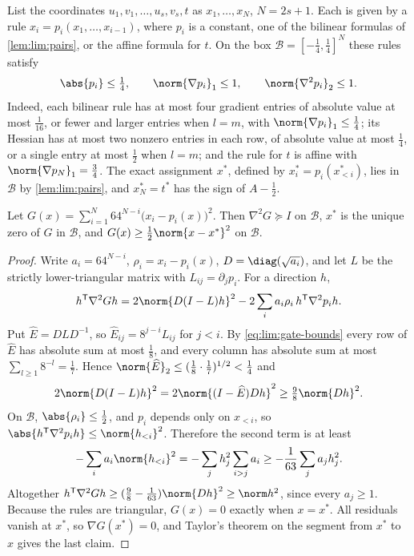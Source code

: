 List the coordinates $u_1,v_1,\ldots,u_s,v_s,t$ as $x_1,\ldots,x_N$, $N=2s+1$.
Each is given by a rule $x_i=p_i(x_1,\ldots,x_{i-1})$, where $p_i$ is a
constant, one of the bilinear formulas of \cref{lem:lim:pairs}, or the
affine formula for $t$. On the box $\mathcal B=[-\frac14,\frac14]^N$ these
rules satisfy
\begin{equation}\label{eq:lim:gate-bounds}
 \abs{p_i}\le\tfrac14,\qquad\norm{\nabla p_i}_1\le1,\qquad
 \norm{\nabla^2p_i}_2\le1 .
\end{equation}
Indeed, each bilinear rule has at most four gradient entries of absolute
value at most $\frac1{16}$, or fewer and larger entries when $l=m$, with
$\norm{\nabla p_i}_1\le\frac14$; its Hessian has at most two nonzero entries
in each row, of absolute value at most $\frac14$, or a single entry at most
$\frac12$ when $l=m$; and the rule for $t$ is affine with
$\norm{\nabla p_N}_1=\frac34$. The exact assignment $x^*$, defined by
$x_i^*=p_i(x_{<i}^*)$, lies in $\mathcal B$ by \cref{lem:lim:pairs}, and
$x_N^*=t^*$ has the sign of $A-\frac12$.

\begin{lemma}\label{lem:lim:gates}
Let $G(x)=\sum_{i=1}^N64^{N-i}\bigl(x_i-p_i(x)\bigr)^2$. Then
$\nabla^2G\succeq I$ on $\mathcal B$, $x^*$ is the unique zero of $G$ in
$\mathcal B$, and $G(x)\ge\frac12\norm{x-x^*}^2$ on $\mathcal B$.
\end{lemma}

\begin{proof}
Write $a_i=64^{N-i}$, $\rho_i=x_i-p_i(x)$, $D=\diag(\sqrt{a_i})$, and let $L$
be the strictly lower-triangular matrix with $L_{ij}=\partial_jp_i$. For a
direction $h$,
\[
 h^{\mathsf T}\nabla^2Gh=2\norm{D(I-L)h}^2-2\sum_ia_i\rho_i\,h^{\mathsf T}\nabla^2p_ih .
\]
Put $\widehat E=DLD^{-1}$, so $\widehat E_{ij}=8^{j-i}L_{ij}$ for $j<i$. By
\eqref{eq:lim:gate-bounds} every row of $\widehat E$ has absolute sum at
most $\frac18$, and every column has absolute sum at most
$\sum_{l\ge1}8^{-l}=\frac17$. Hence
$\norm{\widehat E}_2\le(\frac18\cdot\frac17)^{1/2}<\frac14$ and
\[
 2\norm{D(I-L)h}^2=2\norm{(I-\widehat E)Dh}^2\ge\tfrac98\norm{Dh}^2 .
\]
On $\mathcal B$, $\abs{\rho_i}\le\frac12$, and $p_i$ depends only on
$x_{<i}$, so $\abs{h^{\mathsf T}\nabla^2p_ih}\le\norm{h_{<i}}^2$. Therefore the
second term is at least
\[
 -\sum_ia_i\norm{h_{<i}}^2=-\sum_jh_j^2\sum_{i>j}a_i\ge-\frac1{63}\sum_ja_jh_j^2 .
\]
Altogether $h^{\mathsf T}\nabla^2Gh\ge(\frac98-\frac1{63})\norm{Dh}^2\ge\norm h^2$,
since every $a_j\ge1$. Because the rules are triangular, $G(x)=0$ exactly
when $x=x^*$. All residuals vanish at $x^*$, so $\nabla G(x^*)=0$, and
Taylor's theorem on the segment from $x^*$ to $x$ gives the last claim.
\end{proof}

